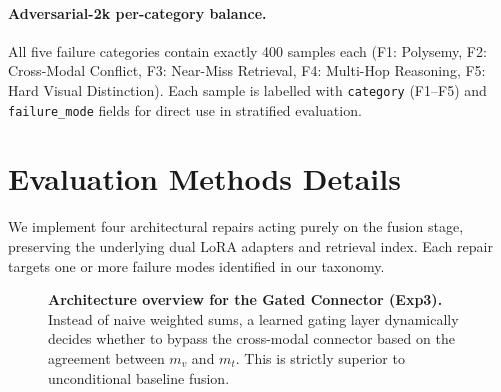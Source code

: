 \documentclass{article}
\begin{document}
\paragraph{Adversarial-2k per-category balance.}
All five failure categories contain exactly 400 samples each (F1: Polysemy, F2: Cross-Modal Conflict, F3: Near-Miss Retrieval, F4: Multi-Hop Reasoning, F5: Hard Visual Distinction). Each sample is labelled with \texttt{category} (F1--F5) and \texttt{failure\_mode} fields for direct use in stratified evaluation.


\section{Evaluation Methods Details}
\label{app:methods}

We implement four architectural repairs acting purely on the fusion stage, preserving the underlying dual LoRA adapters and retrieval index. Each repair targets one or more failure modes identified in our taxonomy.

\begin{figure}[h]
  \centering
  \caption{\textbf{Architecture overview for the Gated Connector (Exp3).} Instead of naive weighted sums, a learned gating layer dynamically decides whether to bypass the cross-modal connector based on the agreement between $m_v$ and $m_t$. This is strictly superior to unconditional baseline fusion.}
  \label{fig:architecture}
\end{figure}
\end{document}
